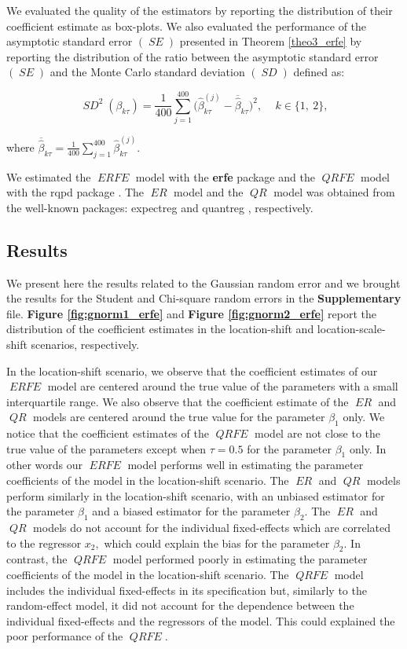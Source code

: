 \documentclass[15pt,a4paper]{article}
\DeclareMathOperator{\ERFE}{\textit{ERFE}}
\DeclareMathOperator{\QRFE}{\textit{QRFE}}
\DeclareMathOperator{\ER}{\textit{ER}}
\DeclareMathOperator{\QR}{\textit{QR}}
\DeclareMathOperator{\SE}{\textit{SE}}
\DeclareMathOperator{\SD}{\textit{SD}}
\begin{document}
We evaluated the quality of the estimators by reporting the distribution of their coefficient estimate as box-plots. We also evaluated the performance of the asymptotic standard error $(\SE)$ presented in Theorem \ref{theo3_erfe} by reporting the distribution of the ratio between the asymptotic standard error $(\SE)$ and the Monte Carlo standard deviation $(\SD)$ defined as: 

\begin{equation*}
\SD^{2}(\beta_{k\tau}) = \frac{1}{400}  \sum_{j=1}^{400} \Big(\widehat{\beta}^{(j)}_{k\tau} - \overline{\widehat{\beta}}_{k\tau}\Big)^2, \, \quad k \in \lbrace 1,\ 2\rbrace, 
\end{equation*}

where $\overline{\widehat{\beta}}_{k\tau} = \frac{1}{400}  \sum_{j=1}^{400} \widehat{\beta}^{(j)}_{k\tau}.$ 

We estimated the $\ERFE$ model with the \textbf{erfe} package and the $\QRFE$ model with the rqpd package \citep{rqpd}. The $\ER$ model and the $\QR$ model was obtained from the well-known packages: expectreg \citep{expectreg} and quantreg \citep{quantreg}, respectively. 

\subsection{Results}

We present here the results related to the Gaussian random error and we brought the results for the Student and Chi-square random errors in the \textbf{Supplementary} file. \textbf{Figure \ref{fig:gnorm1_erfe}} and \textbf{Figure \ref{fig:gnorm2_erfe}} report the distribution of the coefficient estimates in the location-shift and location-scale-shift scenarios, respectively. 

In the location-shift scenario, we observe that the coefficient estimates of our $\ERFE$ model are centered around the true value of the parameters with a small interquartile range. We also observe that the coefficient estimate of the $\ER$ and $\QR$ models are centered around the true value for the parameter $\beta_1$ only. We notice that the coefficient estimates of the $\QRFE$ model are not close to the true value of the parameters except when $\tau=0.5$ for the parameter $\beta_1$ only. In other words our $\ERFE$ model performs well in estimating the parameter coefficients of the model in the location-shift scenario. The $\ER$ and $\QR$ models perform similarly in the location-shift scenario, with an unbiased estimator for the parameter $\beta_1$ and a biased estimator for the parameter $\beta_2.$ The $\ER$ and $\QR$ models do not account for the individual fixed-effects which are correlated to the regressor $x_2,$ which could explain the bias for the parameter $\beta_2.$ In contrast, the $\QRFE$ model performed poorly in estimating the parameter coefficients of the model in the location-shift scenario. The $\QRFE$ model includes the individual fixed-effects in its specification but, similarly to the random-effect model, it did not account for the dependence between the individual fixed-effects and the regressors of the model. This could explained the poor performance of the $\QRFE.$ 
\end{document}
